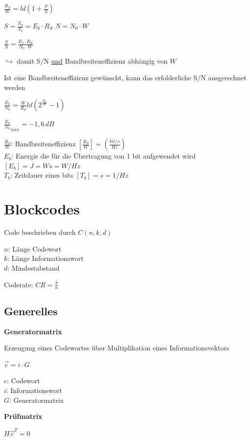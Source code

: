 $\displaystyle{
    \frac{R_S}{W} = ld\left( 1 + \frac{S}{N} \right)
}$

$\displaystyle{
    S = \frac{E_b}{T_b} = E_b \cdot R_S
}$\;\;\;\;\;\;\;\;\;\;
$\displaystyle{
    N = N_0 \cdot W
}$

$\displaystyle{
    \frac{S}{N} = \frac{E_b \cdot R_S}{N_0 \cdot W}
}$

$\hookrightarrow$ damit S/N \underline{und} Bandbreiteneffizienz abhängig von $W$

Ist eine Bandbreiteneffizienz gewünscht, kann das erfolderliche S/N ausgerechnet werden

$\displaystyle{
    \frac{E_b}{N_0} = \frac{W}{R_S} ld \left( 2^{\frac{R_S}{W}} - 1 \right)
}$

$\displaystyle{
    \frac{E_b}{N_0}_{min} = -1,6\,dB
}$

$\frac{R_S}{W}$: Bandbreiteneffizienz $[\frac{R_S}{W}] = \left(\frac{bit/s}{Hz}\right)$\\
$E_b$: Energie die für die Übertragung von 1 bit aufgewendet wird $[E_b] = J = Ws = W/Hz$\\
$T_b$: Zeitdauer eines bits $[T_b] = s = 1/Hz$

\section{Blockcodes}

Code beschrieben durch $C(n, k, d)$

$n$: Länge Codewort\\
$k$: Länge Informationswort\\
$d$: Mindestabstand

Coderate: 
$\displaystyle{
    CR = \frac{k}{n}
}$

\subsection{Generelles}

\textbf{Generatormatrix}

Erzeugung eines Codewortes über Multiplikation eines Informationsvektors

$\displaystyle{
    \vec{c} = i \cdot G
}$

$c$: Codewort\\
$i$: Informationswort\\
$G$: Generatormatrix

\textbf{Prüfmatrix}

$\displaystyle{
    H \vec{c}^T = 0
}$

